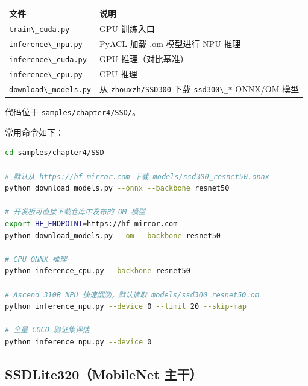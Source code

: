 \begin{longtable}[]{@{}
  >{\raggedright\arraybackslash}p{}
  >{\raggedright\arraybackslash}p{}@{}}
\toprule\noalign{}
\begin{minipage}[b]{\linewidth}\raggedright
文件
\end{minipage} & \begin{minipage}[b]{\linewidth}\raggedright
说明
\end{minipage} \\
\midrule\noalign{}
\endhead
\bottomrule\noalign{}
\endlastfoot
\passthrough{\lstinline!train\_cuda.py!} & GPU 训练入口 \\
\passthrough{\lstinline!inference\_npu.py!} & PyACL 加载 .om 模型进行
NPU 推理 \\
\passthrough{\lstinline!inference\_cuda.py!} & GPU 推理（对比基准） \\
\passthrough{\lstinline!inference\_cpu.py!} & CPU 推理 \\
\passthrough{\lstinline!download\_models.py!} & 从
\passthrough{\lstinline!zhouxzh/SSD300!} 下载
\passthrough{\lstinline!ssd300\_*!} ONNX/OM 模型 \\
\end{longtable}

代码位于
\href{https://github.com/zhouxzh/Ascend310/tree/master/samples/chapter4/SSD/}{\passthrough{\lstinline!samples/chapter4/SSD/!}}。

常用命令如下：

\begin{lstlisting}[language=bash]
cd samples/chapter4/SSD

# 默认从 https://hf-mirror.com 下载 models/ssd300_resnet50.onnx
python download_models.py --onnx --backbone resnet50

# 开发板可直接下载仓库中发布的 OM 模型
export HF_ENDPOINT=https://hf-mirror.com
python download_models.py --om --backbone resnet50

# CPU ONNX 推理
python inference_cpu.py --backbone resnet50

# Ascend 310B NPU 快速烟测，默认读取 models/ssd300_resnet50.om
python inference_npu.py --device 0 --limit 20 --skip-map

# 全量 COCO 验证集评估
python inference_npu.py --device 0
\end{lstlisting}

\subsection{SSDLite320（MobileNet 主干）}\label{src-book-chapter4-h33}

